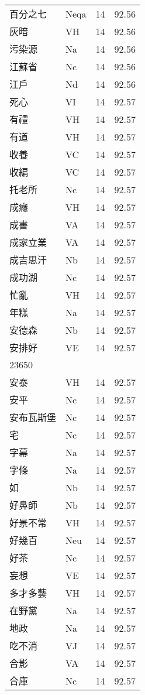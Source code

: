 \documentclass[twocolumn]{book}
\begin{document}
\begin{supertabular}{llrr}
百分之七 & Neqa & 14 &  92.56\\
灰暗 & VH & 14 &  92.56\\
污染源 & Na & 14 &  92.56\\
江蘇省 & Nc & 14 &  92.56\\
江戶 & Nd & 14 &  92.56\\
死心 & VI & 14 &  92.57\\
有禮 & VH & 14 &  92.57\\
有道 & VH & 14 &  92.57\\
收養 & VC & 14 &  92.57\\
收編 & VC & 14 &  92.57\\
托老所 & Nc & 14 &  92.57\\
成癮 & VH & 14 &  92.57\\
成書 & VA & 14 &  92.57\\
成家立業 & VA & 14 &  92.57\\
成吉思汗 & Nb & 14 &  92.57\\
成功湖 & Nc & 14 &  92.57\\
忙亂 & VH & 14 &  92.57\\
年糕 & Na & 14 &  92.57\\
安德森 & Nb & 14 &  92.57\\
安排好 & VE & 14 &  92.57\\
23650\\
安泰 & VH & 14 &  92.57\\
安平 & Nc & 14 &  92.57\\
安布瓦斯堡 & Nc & 14 &  92.57\\
宅 & Nc & 14 &  92.57\\
字幕 & Na & 14 &  92.57\\
字條 & Na & 14 &  92.57\\
如 & Nb & 14 &  92.57\\
好鼻師 & Nb & 14 &  92.57\\
好景不常 & VH & 14 &  92.57\\
好幾百 & Neu & 14 &  92.57\\
好茶 & Nc & 14 &  92.57\\
妄想 & VE & 14 &  92.57\\
多才多藝 & VH & 14 &  92.57\\
在野黨 & Na & 14 &  92.57\\
地政 & Na & 14 &  92.57\\
吃不消 & VJ & 14 &  92.57\\
合影 & VA & 14 &  92.57\\
合庫 & Nc & 14 &  92.57\\

\end{supertabular}
\end{document}
